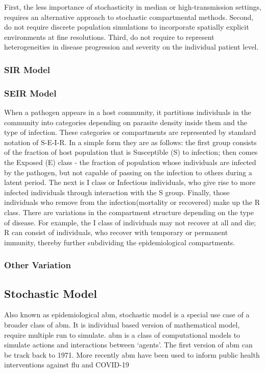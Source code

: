 \documentclass[a4paper, 12pt, twoside]{article}
\begin{document}
First, the less importance of stochasticity in median or high-transmission settings, requires an alternative approach to stochastic compartmental methods.
Second, do not require discrete population simulations to incorporate spatially explicit environments at fine resolutions.
Third, do not require to represent heterogeneities in disease progression and severity on the individual patient level. 

\subsubsection{SIR Model}

\subsubsection{SEIR Model}
When a pathogen appears in a host community, it partitions individuals in the community into categories depending on parasite density inside them and the type of infection.
These categories or compartments are represented by standard notation of S-E-I-R.
In a simple form they are as follows: the first group consists of the fraction of host population that is Susceptible (S) to infection; then comes the Exposed (E) class - the fraction of population whose individuals are infected by the pathogen, but not capable of passing on the infection to others during a latent period.
The next is I class or Infectious individuals, who give rise to more infected individuals through interaction with the S group.
Finally, those individuals who remove from the infection(mortality or recovered) make up the R class.
There are variations in the compartment structure depending on the type of disease.
For example, the I class of individuals may not recover at all and die; R can consist of individuals, who recover with temporary or permanent immunity, thereby further subdividing the epidemiological compartments.

\subsubsection{Other Variation}

\subsection{Stochastic Model}

Also known as epidemiological \gls{abm}, stochastic model is a special use case of a broader class of \gls{abm}.
It is individual based version of mathematical model, require multiple run to simulate.
\gls{abm} is a class of computational models to simulate actions and interactions between `agents'.
The first version of \gls{abm} can be track back to 1971\cite{Schelling1971}.
More recently \gls{abm} have been used to inform public health interventions against flu\cite{Ferguson2006a, Ferguson2005} and COVID-19\cite{Maziarz2020, Ferguson2020, Chang2020}
\end{document}
